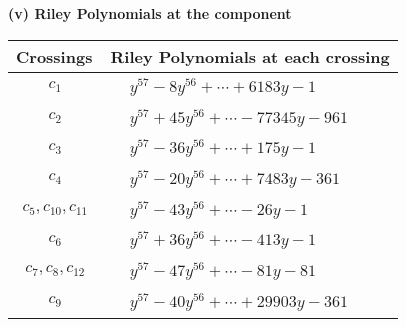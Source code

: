 \documentclass[1p]{elsarticle_modified}
\theoremstyle{definition}
\begin{document}
\newpage\renewcommand{\arraystretch}{1}
\flushleft \textbf{(v) Riley Polynomials at the component}\newline \\
\begin{tabular}{m{50pt}|m{274pt}}
Crossings & \hspace{64pt}Riley Polynomials at each crossing \\
\hline $$\begin{aligned}c_{1}\end{aligned}$$&$\begin{aligned}
&y^{57}-8 y^{56}+\cdots+6183 y-1
\end{aligned}$\\
\hline $$\begin{aligned}c_{2}\end{aligned}$$&$\begin{aligned}
&y^{57}+45 y^{56}+\cdots-77345 y-961
\end{aligned}$\\
\hline $$\begin{aligned}c_{3}\end{aligned}$$&$\begin{aligned}
&y^{57}-36 y^{56}+\cdots+175 y-1
\end{aligned}$\\
\hline $$\begin{aligned}c_{4}\end{aligned}$$&$\begin{aligned}
&y^{57}-20 y^{56}+\cdots+7483 y-361
\end{aligned}$\\
\hline $$\begin{aligned}c_{5},c_{10},c_{11}\end{aligned}$$&$\begin{aligned}
&y^{57}-43 y^{56}+\cdots-26 y-1
\end{aligned}$\\
\hline $$\begin{aligned}c_{6}\end{aligned}$$&$\begin{aligned}
&y^{57}+36 y^{56}+\cdots-413 y-1
\end{aligned}$\\
\hline $$\begin{aligned}c_{7},c_{8},c_{12}\end{aligned}$$&$\begin{aligned}
&y^{57}-47 y^{56}+\cdots-81 y-81
\end{aligned}$\\
\hline $$\begin{aligned}c_{9}\end{aligned}$$&$\begin{aligned}
&y^{57}-40 y^{56}+\cdots+29903 y-361
\end{aligned}$\\
\hline
\end{tabular}\\~\\
\end{document}
